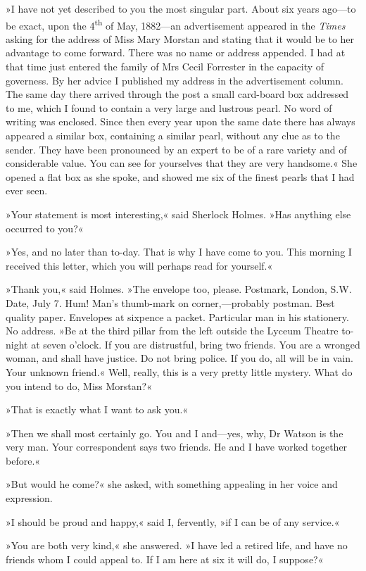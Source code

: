 »I have not yet described to you the most singular part. About six years ago—to be exact, upon the 4\textsuperscript{th} of May, 1882—an advertisement appeared in the \textit{Times} asking for the address of Miss Mary Morstan and stating that it would be to her advantage to come forward. There was no name or address appended. I had at that time just entered the family of Mrs Cecil Forrester in the capacity of governess. By her advice I published my address in the advertisement column. The same day there arrived through the post a small card-board box addressed to me, which I found to contain a very large and lustrous pearl. No word of writing was enclosed. Since then every year upon the same date there has always appeared a similar box, containing a similar pearl, without any clue as to the sender. They have been pronounced by an expert to be of a rare variety and of considerable value. You can see for yourselves that they are very handsome.« She opened a flat box as she spoke, and showed me six of the finest pearls that I had ever seen.

»Your statement is most interesting,« said Sherlock Holmes. »Has anything else occurred to you?«

»Yes, and no later than to-day. That is why I have come to you. This morning I received this letter, which you will perhaps read for yourself.«

»Thank you,« said Holmes. »The envelope too, please. Postmark, London, S.W. Date, July 7. Hum! Man's thumb-mark on corner,—probably postman. Best quality paper. Envelopes at sixpence a packet. Particular man in his stationery. No address. »Be at the third pillar from the left outside the Lyceum Theatre to-night at seven o'clock. If you are distrustful, bring two friends. You are a wronged woman, and shall have justice. Do not bring police. If you do, all will be in vain. Your unknown friend.« Well, really, this is a very pretty little mystery. What do you intend to do, Miss Morstan?«

»That is exactly what I want to ask you.«

»Then we shall most certainly go. You and I and—yes, why, Dr Watson is the very man. Your correspondent says two friends. He and I have worked together before.«

»But would he come?« she asked, with something appealing in her voice and expression.

»I should be proud and happy,« said I, fervently, »if I can be of any service.«

»You are both very kind,« she answered. »I have led a retired life, and have no friends whom I could appeal to. If I am here at six it will do, I suppose?«

